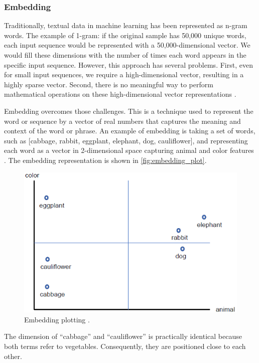 \subsubsection*{Embedding}
Traditionally, textual data in machine learning has been represented as n-gram words. The example of 1-gram: if the original sample has 50,000 unique words, each input sequence would be represented with a 50,000-dimensional vector. We would fill these dimensions with the number of times each word appears in the specific input sequence. However, this approach has several problems. First, even for small input sequences, we require a high-dimensional vector, resulting in a highly sparse vector. Second, there is no meaningful way to perform mathematical operations on these high-dimensional vector representations \cite{timsina2024building}.

Embedding overcomes those challenges. This is a technique used to represent the word or sequence by a vector of real numbers that captures the meaning and context of the word or phrase. An example of embedding is taking a set of words, such as [cabbage, rabbit, eggplant, elephant, dog, cauliflower], and representing each word as a vector in 2-dimensional space capturing animal and color features \cite{timsina2024building}. The embedding representation is shown in \autoref{fig:embedding_plot}.

\begin{figure}[htbp]
    \centering
    \includegraphics[width=0.7\linewidth]{obrazky-figures/02-theoretical-basis/embedding-vector.png}
    \caption{Embedding plotting \cite{timsina2024building}.}
    \label{fig:embedding_plot}
\end{figure}

The dimension of \enquote{cabbage} and \enquote{cauliflower} is practically identical because both terms refer to vegetables. Consequently, they are positioned close to each other.

